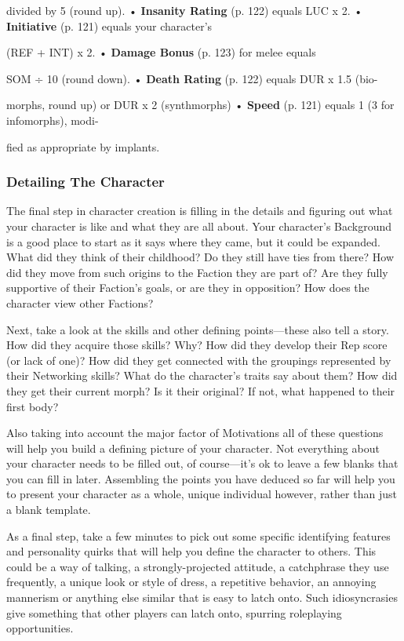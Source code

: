 divided by 5 (round up).
•  \textbf{Insanity Rating} (p. 122) equals LUC x 2.
•  \textbf{Initiative} (p. 121) equals your character's 

(REF + INT) x 2.
•  \textbf{Damage Bonus} (p. 123) for melee equals 

SOM ÷ 10 (round down).
•  \textbf{Death Rating} (p. 122) equals DUR x 1.5 (bio-

morphs, round up) or DUR x 2 (synthmorphs)
•  \textbf{Speed} (p. 121) equals 1 (3 for infomorphs), modi-

fied as appropriate by implants.

\subsubsection{Detailing The Character}

The final step in character creation is filling in the details
and figuring out what your character is like and
what they are all about. Your character's Background 
is a good place to start as it says where they came, but 
it could be expanded. What did they think of their 
childhood? Do they still have ties from there? How 
did they move from such origins to the Faction they 
are part of? Are they fully supportive of their Faction's 
goals, or are they in opposition? How does the character
view other Factions?

Next, take a look at the skills and other defining 
points—these also tell a story. How did they acquire 
those skills? Why? How did they develop their Rep 
score (or lack of one)? How did they get connected 
with the groupings represented by their Networking 
skills? What do the character's traits say about them? 
How did they get their current morph? Is it their 
original? If not, what happened to their first body?

Also taking into account the major factor of Motivations
all of these questions will help you build a defining
picture of your character. Not everything about
your character needs to be filled out, of course—it's 
ok to leave a few blanks that you can fill in later. Assembling
the points you have deduced so far will help
you to present your character as a whole, unique individual
however, rather than just a blank template.

As a final step, take a few minutes to pick out some 
specific identifying features and personality quirks that 
will help you define the character to others. This could 
be a way of talking, a strongly-projected attitude, a 
catchphrase they use frequently, a unique look or style 
of dress, a repetitive behavior, an annoying mannerism
or anything else similar that is easy to latch onto.
Such idiosyncrasies give something that other players 
can latch onto, spurring roleplaying opportunities.

